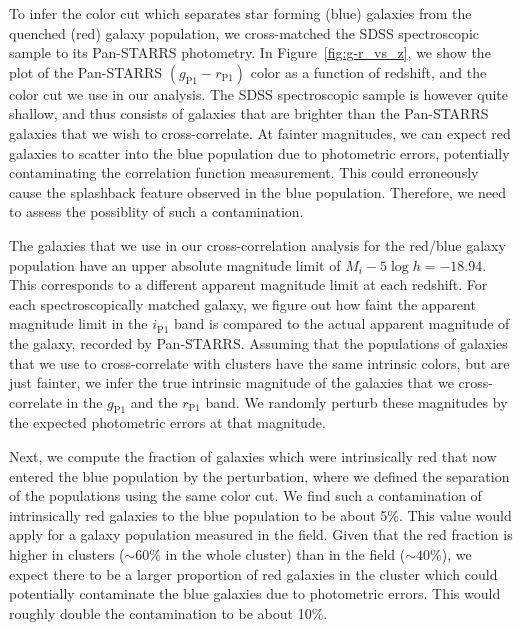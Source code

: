 \documentclass[iop, apjl, twocolappendix, numberedappendix]{emulateapj}
\begin{document}
To infer the color cut which separates star forming (blue) galaxies from the
quenched (red) galaxy population, we cross-matched the SDSS spectroscopic
sample to its Pan-STARRS photometry. In Figure~\ref{fig:g-r_vs_z}, we show the
plot of the Pan-STARRS $(g_{\mathrm{P1}}-r_{\mathrm{P1}})$ color as a
function of redshift, and the color cut we use in our analysis.
The SDSS spectroscopic sample is however quite shallow,
and thus consists of galaxies that are brighter than the Pan-STARRS
galaxies that we wish to cross-correlate. At fainter magnitudes, we can
expect red galaxies to scatter into the blue population
due to photometric errors, potentially contaminating the
correlation function measurement. This could erroneously cause the
splashback feature observed in the blue population. Therefore, we
need to assess the possiblity of such a contamination.


The galaxies that we use in our cross-correlation analysis for the red/blue
galaxy population have an upper absolute magnitude limit of $M_{i}-5\log h=-18.94$. This
corresponds to a different apparent magnitude limit at each redshift.
For each spectroscopically matched galaxy, we figure out how faint the
apparent magnitude limit in the $i_{\mathrm{P1}}$ band is compared to the actual
apparent magnitude of the galaxy, recorded by Pan-STARRS. Assuming that the populations of
galaxies that we use to cross-correlate with clusters have the same
intrinsic colors, but are just fainter, we infer the true
intrinsic magnitude of the galaxies that we cross-correlate in the
$g_{\mathrm{P1}}$ and the $r_{\mathrm{P1}}$ band. We randomly perturb these magnitudes
by the expected photometric errors at that magnitude.

Next, we compute the fraction of galaxies which were intrinsically red
that now entered the blue population by the perturbation, where we
defined the separation of the populations using the same color
cut. We find such a contamination of intrinsically red galaxies to
the blue population to be about 5\%. This value would apply for a galaxy population
measured in the field. Given that the red fraction is higher in clusters ($\sim
60$\% in the whole cluster) than in the field ($\sim 40$\%),
we expect there to be a larger proportion of red galaxies in the cluster which could
potentially contaminate the blue galaxies due to photometric errors.
This would roughly double the contamination to be about 10\%.
\end{document}
